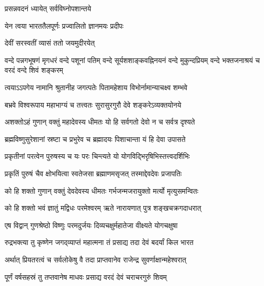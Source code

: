 
{प्रसन्नवदनं ध्यायेत् सर्वविघ्नोपशान्तये}

{येन त्वया भारततैलपूर्णः प्रज्वालितो ज्ञानमयः प्रदीपः}%


{देवीं सरस्वतीं व्यासं ततो जयमुदीरयेत्}


{वन्दे पन्नगभूषणं मृगधरं वन्दे पशूनां पतिम्}
{वन्दे सूर्यशशाङ्कवह्निनयनं वन्दे मुकुन्दप्रियम्}
{वन्दे भक्तजनाश्रयं च वरदं वन्दे शिवं शङ्करम्}


\twolineshloka
{त्वयाऽऽपगेय नामानि श्रुतानीह जगत्पतेः}%
{पितामहेशाय विभोर्नामान्याचक्ष्व शम्भवे}%

\twolineshloka
{बभ्रवे विश्वरूपाय महाभाग्यं च तत्त्वतः}%
{सुरासुरगुरौ देवे शङ्करेऽव्यक्तयोनये}%

\twolineshloka
{अशक्तोऽहं गुणान् वक्तुं महादेवस्य धीमतः}%
{यो हि सर्वगतो देवो न च सर्वत्र दृश्यते}%

\twolineshloka
{ब्रह्मविष्णुसुरेशानां स्रष्टा च प्रभुरेव च}%
{ब्रह्मादयः पिशाचान्ता यं हि देवा उपासते}%

\twolineshloka
{प्रकृतीनां परत्वेन पुरुषस्य च यः परः}%
{चिन्त्यते यो योगविद्भिरृषिभिस्तत्त्वदर्शिभिः}%

\twolineshloka
{प्रकृतिं पुरुषं चैव क्षोभयित्वा स्वतेजसा}%
{ब्रह्माणमसृजत् तस्माद्देवदेवः प्रजापतिः}%


\twolineshloka
{को हि शक्तो गुणान् वक्तुं देवदेवस्य धीमतः}%
{गर्भजन्मजरायुक्तो मर्त्यो मृत्युसमन्वितः}%

\twolineshloka
{को हि शक्तो भवं ज्ञातुं मद्विधः परमेश्वरम्}%
{ऋते नारायणात् पुत्र शङ्खचक्रगदाधरात्}%

\twolineshloka
{एष विद्वान् गुणश्रेष्ठो विष्णुः परमदुर्जयः}%
{दिव्यचक्षुर्महातेजा वीक्ष्यते योगचक्षुषा}%

\twolineshloka
{रुद्रभक्त्या तु कृष्णेन जगद्‌व्याप्तं महात्मना}%
{तं प्रसाद्य तदा देवं बदर्यां किल भारत}%

\twolineshloka
{अर्थात् प्रियतरत्वं च सर्वलोकेषु वै तदा}%
{प्राप्तवानेव राजेन्द्र सुवर्णाक्षान्महेश्वरात्}%

\twolineshloka
{पूर्णं वर्षसहस्रं तु तप्तवानेष माधवः}%
{प्रसाद्य वरदं देवं चराचरगुरुं शिवम्}%

